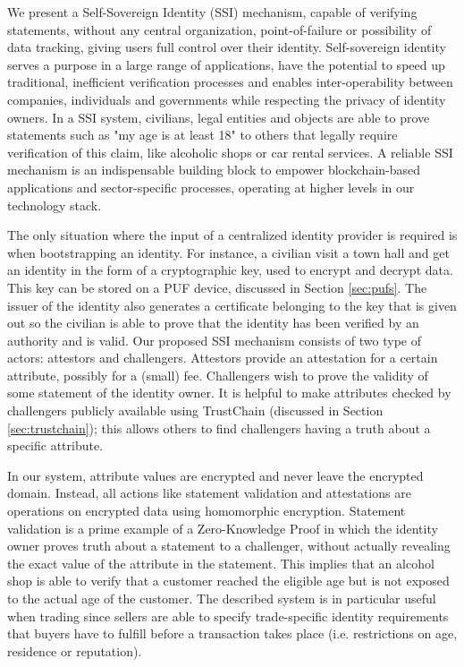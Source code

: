\documentclass[USenglish]{article}
\begin{document}
We present a Self-Sovereign Identity (SSI) mechanism, capable of verifying statements, without any central organization, point-of-failure or possibility of data tracking, giving users full control over their identity.
Self-sovereign identity serves a purpose in a large range of applications, have the potential to speed up traditional, inefficient verification processes and enables inter-operability between companies, individuals and governments while respecting the privacy of identity owners.
In a SSI system, civilians, legal entities and objects are able to prove statements such as "my age is at least 18" to others that legally require verification of this claim, like alcoholic shops or car rental services.
A reliable SSI mechanism is an indispensable building block to empower blockchain-based applications and sector-specific processes, operating at higher levels in our technology stack.

The only situation where the input of a centralized identity provider is required is when bootstrapping an identity.
For instance, a civilian visit a town hall and get an identity in the form of a cryptographic key, used to encrypt and decrypt data.
This key can be stored on a PUF device, discussed in Section \ref{sec:pufs}.
The issuer of the identity also generates a certificate belonging to the key that is given out so the civilian is able to prove that the identity has been verified by an authority and is valid.
Our proposed SSI mechanism consists of two type of actors: attestors and challengers.
Attestors provide an attestation for a certain attribute, possibly for a (small) fee.
Challengers wish to prove the validity of some statement of the identity owner.
It is helpful to make attributes checked by challengers publicly available using TrustChain (discussed in Section \ref{sec:trustchain}); this allows others to find challengers having a truth about a specific attribute.

In our system, attribute values are encrypted and never leave the encrypted domain.
Instead, all actions like statement validation and attestations are operations on encrypted data using homomorphic encryption.
Statement validation is a prime example of a Zero-Knowledge Proof in which the identity owner proves truth about a statement to a challenger, without actually revealing the exact value of the attribute in the statement.
This implies that an alcohol shop is able to verify that a customer reached the eligible age but is not exposed to the actual age of the customer.
The described system is in particular useful when trading since sellers are able to specify trade-specific identity requirements that buyers have to fulfill before a transaction takes place (i.e. restrictions on age, residence or reputation).
\end{document}
